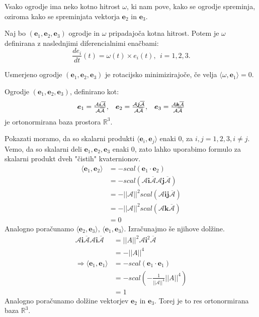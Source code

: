\documentclass[mat1]{fmfdelo}
\newcommand{\R}{\mathbb R}
\newcommand{\ii}{\boldsymbol i}
\newcommand{\jj}{\boldsymbol j}
\newcommand{\kk}{\boldsymbol k}
\newcommand{\e}{\boldsymbol e}
\newcommand{\A}{\mathcal A}
\begin{document}
Vsako ogrodje ima neko kotno hitrost $\omega$, ki nam pove, kako se ogrodje spreminja, oziroma kako se spreminjata vektorja $\e_2$ in $\e_3$.
\begin{definicija}
Naj bo $(\e_1,\e_2,\e_3)$ ogrodje in $\omega$ pripadajoča kotna hitrost. Potem je $\omega$ definirana z naslednjimi diferencialnimi enačbami:
\begin{equation}
\frac{de_i}{dt}(t) = \omega(t) \times e_i(t), ~~ i=1,2,3.
\end{equation}
\end{definicija}
\begin{definicija}
Usmerjeno ogrodje $(\e_1,\e_2,\e_3)$ je rotacijsko minimizirajoče, če velja $\langle \omega,\e_1\rangle = 0.$
\end{definicija}

\begin{trditev}
Ogrodje $(\e_1,\e_2,\e_3)$, definirano kot: 
\begin{equation*}
\begin{array}{c c c}
\e_1 = \frac{\A\ii\overline{\A}}{\A\overline{\A}}, &
\e_2 = \frac{\A\jj\overline{\A}}{\A\overline{\A}}, &
\e_3 = \frac{\A\kk\overline{\A}}{\A\overline{\A}}
\end{array}
\end{equation*}
je ortonormirana baza prostora $\R^3$.
\end{trditev}
\begin{dokaz}
Pokazati moramo, da so skalarni produkti $\langle \e_i, \e_j \rangle $ enaki 0, za $i, j = 1,2,3, i \neq j$. Vemo, da so skalarni deli $\e_1,\e_2,\e_3$ enaki 0, zato lahko uporabimo formulo za skalarni produkt dveh "čistih" kvaternionov.
\begin{equation*}
\begin{split}
	\langle \e_1,\e_2 \rangle& = -scal \left( \e_1 \cdot \e_2 \right) \\
	& = -scal \left( \A \ii \overline{\A} \A \jj \overline{\A} \right) \\
	&= - ||\A||^2 scal \left( \A \ii \jj \overline{\A} \right) \\
	& = - ||\A||^2 scal \left( \A \kk \overline{\A} \right) \\
	& = 0
\end{split}
\end{equation*}
Analogno poračunamo $\langle \e_2,\e_3 \rangle$, $\langle \e_1,\e_3 \rangle$.
Izračunajmo še njihove dolžine.
\begin{equation*}
\begin{split}
\A \ii \overline{\A} \A \ii \overline{\A} 	&= ||A||^2 \A \ii^2 \overline{\A} \\
	&= -||A||^4 \\
	\Longrightarrow \langle \e_1,\e_1 \rangle &= -scal \left( \e_1 \cdot \e_1 \right) \\
	&= -scal (-\frac{1}{||\A||^4}||A||^4) \\
	&= 1
\end{split}
\end{equation*}
Analogno poračunamo dolžine vektorjev $\e_2$ in $\e_3$. Torej je to res ortonormirana baza $\R^3$.
\end{dokaz}
\end{document}
